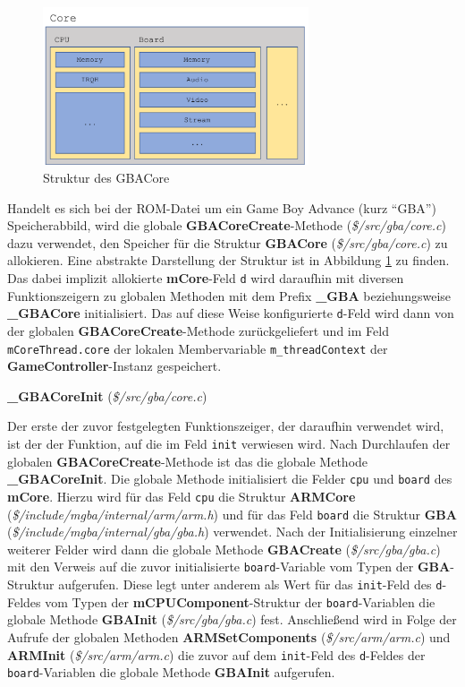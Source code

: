 \documentclass[11pt,a4paper]{scrartcl}
\newcommand{\paratitlecode}[2] {
    \vspace{5mm}
    \large \textbf{#1} \normalsize(\textit{\${#2}})
    \vspace{2mm}\newline
}
\begin{document}
\begin{figure}[h]
    \centering
    \includegraphics[width=0.7\textwidth]{Emulator_Core}
    \caption{Struktur des GBACore}
    \label{fig:mcore}
\end{figure}

Handelt es sich bei der ROM-Datei um ein Game Boy Advance (kurz \enquote{GBA}) Speicherabbild, wird die globale \textbf{GBACoreCreate}-Methode (\textit{\$/src/gba/core.c}) dazu verwendet, den Speicher f\"ur die Struktur \textbf{GBACore} (\textit{\$/src/gba/core.c}) zu allokieren. Eine abstrakte Darstellung der Struktur ist in Abbildung \ref{fig:mcore} zu finden. Das dabei implizit allokierte \textbf{mCore}-Feld \verb|d| wird daraufhin mit diversen Funktionszeigern zu globalen Methoden mit dem Prefix \textbf{{\_}GBA} beziehungsweise \textbf{{\_}GBACore} initialisiert. Das auf diese Weise konfigurierte \verb|d|-Feld wird dann von der globalen \textbf{GBACoreCreate}-Methode zur\"uckgeliefert und im Feld \verb|mCoreThread.core| der lokalen Membervariable \verb|m_threadContext| der \textbf{GameController}-Instanz gespeichert.


\paratitlecode{{\_}GBACoreInit}{/src/gba/core.c}
Der erste der zuvor festgelegten Funktionszeiger, der daraufhin verwendet wird, ist der der Funktion, auf die im Feld \verb|init| verwiesen wird. Nach Durchlaufen der globalen \textbf{GBACoreCreate}-Methode ist das die globale Methode \textbf{{\_}GBACoreInit}. Die globale Methode initialisiert die Felder \verb|cpu| und \verb|board| des \textbf{mCore}. Hierzu wird f\"ur das Feld \verb|cpu| die Struktur \textbf{ARMCore} (\textit{\$/include/mgba/internal/arm/arm.h}) und f\"ur das Feld \verb|board| die Struktur \textbf{GBA} (\textit{\$/include/mgba/internal/gba/gba.h}) verwendet. Nach der Initialisierung einzelner weiterer Felder wird dann die globale Methode \textbf{GBACreate} (\textit{\$/src/gba/gba.c}) mit den Verweis auf die zuvor initialisierte \verb|board|-Variable vom Typen der \textbf{GBA}-Struktur aufgerufen. Diese legt unter anderem als Wert f\"ur das \verb|init|-Feld des \verb|d|-Feldes vom Typen der \textbf{mCPUComponent}-Struktur der \verb|board|-Variablen die globale Methode \textbf{GBAInit} (\textit{\$/src/gba/gba.c}) fest. Anschlie{\ss}end wird in Folge der Aufrufe der globalen Methoden \textbf{ARMSetComponents} (\textit{\$/src/arm/arm.c}) und \textbf{ARMInit} (\textit{\$/src/arm/arm.c}) die zuvor auf dem \verb|init|-Feld des \verb|d|-Feldes der \verb|board|-Variablen die globale Methode \textbf{GBAInit} aufgerufen.
\end{document}
